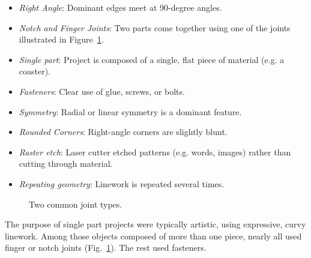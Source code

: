 \documentclass{article}
\begin{document}
\begin{itemize}
\item \textit{Right Angle}: Dominant edges meet at 90-degree angles.
\item \textit{Notch and Finger Joints}: Two parts come together using one of
  the joints illustrated in Figure~\ref{fig:joint}.
\item \textit{Single part}: Project is composed of a single, flat piece of
  material (e.g. a coaster).
\item \textit{Fasteners}: Clear use of glue, screws, or bolts.
\item \textit{Symmetry}: Radial or linear symmetry is a dominant feature.
\item \textit{Rounded Corners}: Right-angle corners are slightly blunt.
\item \textit{Raster etch}: Laser cutter etched patterns (e.g. words,
  images) rather than cutting through material.
\item \textit{Repeating geometry}: Linework is repeated several times.
\end{itemize}

\begin{figure}[h]
\centering 
{}
\caption{Two common joint types.}
\label{fig:joint}
\end{figure}

The purpose of single part projects were typically artistic, using
expressive, curvy linework. Among those objects composed of more than
one piece, nearly all used finger or notch joints
(Fig.~\ref{fig:joint}). The rest used fasteners.
\end{document}
